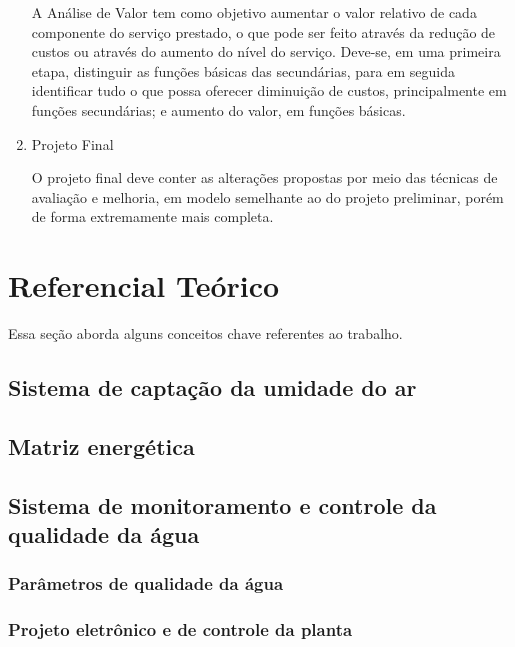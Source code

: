 \begin{enumerate}
    A Análise de Valor tem como objetivo aumentar o valor relativo de cada componente do serviço prestado, o que pode 
    ser feito através da redução de custos ou através do aumento do nível do serviço. Deve-se, em uma primeira etapa,
    distinguir as funções básicas das secundárias, para em seguida identificar tudo o que possa oferecer diminuição de custos,
    principalmente em funções secundárias; e aumento do valor, em funções básicas.
    
  \item Projeto Final
  
    O projeto final deve conter as alterações propostas por meio das técnicas de avaliação e melhoria, em modelo semelhante
    ao do projeto preliminar, porém de forma extremamente mais completa.
    
  \end{enumerate}

  
  \section{Referencial Teórico}
  
    Essa seção aborda alguns conceitos chave referentes ao trabalho.
    
    \subsection{Sistema de captação da umidade do ar}
    
      
    
    \subsection{Matriz energética}
    
      
    
    \subsection{Sistema de monitoramento e controle da qualidade da água}
      
      \subsubsection{Parâmetros de qualidade da água}
          
      \subsubsection{Projeto eletrônico e de controle da planta}
            
